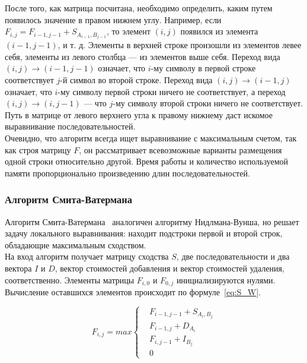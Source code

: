 \indent  После того, как матрица посчитана, необходимо определить, каким путем появилось значение в правом нижнем углу. Например, если $F_{i,j} = F_{i-1,j-1} +S_{A_{i-1},B_{j-1}}$, то элемент $(i, j)$ появился из элемента $(i - 1, j - 1)$, и т. д. Элементы в верхней строке произошли из элементов левее себя, элементы из левого столбца --- из элементов выше себя. Переход вида $(i, j) \rightarrow (i - 1, j - 1)$ означает, что $i$-му символу в первой строке соответствует $j$-й символ во второй строке. Переход вида $(i, j) \rightarrow (i - 1, j)$ означает, что $i$-му символу первой строки ничего не соответствует, а переход $(i, j) \rightarrow (i, j - 1)$ --- что $j$-му символу второй строки ничего не соответствует. Путь в матрице от левого верхнего угла к правому нижнему даст искомое выравнивание последовательностей.\\
\indent Очевидно, что алгоритм всегда ищет выравнивание с максимальным счетом, так как строя матрицу $F$, он рассматривает всевозможные варианты размещения одной строки относительно другой. Время работы и количество используемой памяти пропорционально произведению длин последовательностей.

\subsubsection[Алгоритм Смита-Ватермана]{\large Алгоритм Смита-Ватермана}
\hspace{\parindent} Алгоритм Смита-Ватермана~\cite{SWalgo} аналогичен алгоритму Нидлмана-Вунша, но решает задачу локального выравнивания: находит подстроки первой и второй строк, обладающие максимальным сходством.\\
\indent На вход алгоритм получает матрицу сходства $S$, две последовательности и два вектора $I$ и $D$, вектор стоимостей добавления и вектор стоимостей удаления, соответственно. Элементы матрицы $F_{i,0}$ и $F_{0,j}$ инициализируются нулями.  Вычисление оставшихся элементов происходит по формуле~\ref{eq:S_W}.

\begin{equation}\label{eq:S_W}
F_{i,j} = max\left\{
	\begin{aligned}
		& F_{i-1,j-1} + S_{A_i,B_j}\\
		& F_{i-1,j} + D_{A_i}\\
		& F_{i,j-1} + I_{B_j}\\
		& 0
	\end{aligned}
	\right.
\end{equation}


